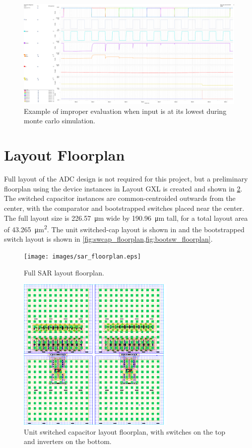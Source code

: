 \documentclass[11pt,letterpaper]{article}
\begin{document}
\begin{figure}[htbp!]
		\centering
	    \includegraphics[width=\textwidth]{images/mc_bad.eps}
		\caption{Example of improper evaluation when input is at its lowest during monte carlo simulation.}\label{fig:mc_bad}
\end{figure}

\section{Layout Floorplan}

Full layout of the ADC design is not required for this project, but a preliminary floorplan using the device instances in Layout GXL is created and shown in \cref{fig:sar_floorplan}. The switched capacitor instances are common-centroided outwards from the center, with the comparator and bootstrapped switches placed near the center. The full layout size is \qty{226.57}{\um} wide by \qty{190.96}{\um} tall, for a total layout area of \qty{43,265}{\um\squared}. The unit switched-cap layout is shown in and the bootstrapped switch layout is shown in \cref{fig:swcap_floorplan,fig:bootsw_floorplan}.

\begin{figure}[htbp!]
		\centering
	    \texttt{[image: images/sar\_floorplan.eps]}
		\caption{Full SAR layout floorplan.}\label{fig:sar_floorplan}
\end{figure}

\begin{figure}[htbp!]
    \centering
    \includegraphics[width=3in]{images/swcap_floorplan.eps}
    \caption{Unit switched capacitor layout floorplan, with switches on the top and inverters on the bottom.}\label{fig:swcap_floorplan}
\end{figure}
\end{document}
